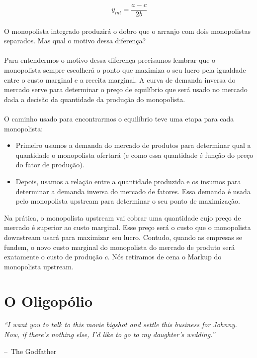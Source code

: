 \documentclass[a4paper,11pt,oneside]{book}
\makeatletter
\theoremstyle{definition}
\theoremstyle{break}
\newenvironment{chapquote}[2][2em]
  {\setlength{\@tempdima}{#1}%
   \def\chapquote@author{#2}%
   \parshape 1 \@tempdima \dimexpr\textwidth-2\@tempdima\relax%
   \itshape}
  {\par\normalfont\hfill--\ \chapquote@author\hspace*{\@tempdima}\par\bigskip}
\makeatother
\begin{document}
$$ y_{int} = \frac{a - c}{2b}$$
\\
O monopolista integrado produzirá o dobro que o arranjo com dois monopolistas separados. Mas qual o motivo dessa diferença?
\\
\\
Para entendermos o motivo dessa diferença precisamos lembrar que o monopolista sempre escolherá o ponto que maximiza o seu lucro pela igualdade entre o custo marginal e a receita marginal. A curva de demanda inversa do mercado serve para determinar o preço de equilíbrio que será usado no mercado dada a decisão da quantidade da produção do monopolista.
\\
\\
O caminho usado para encontrarmos o equilíbrio teve uma etapa para cada monopolista:
\begin{itemize}

\item Primeiro usamos a demanda do mercado de produtos para determinar qual a quantidade o monopolista ofertará (e como essa quantidade é função do preço do fator de produção).

\item Depois, usamos a relação entre a quantidade produzida e os insumos para determinar a demanda inversa do mercado de fatores. Essa demanda é usada pelo monopolista upstream para determinar o seu ponto de maximização.

\end{itemize}

Na prática, o monopolista upstream vai cobrar uma quantidade cujo preço de mercado é superior ao custo marginal. Esse preço será o custo que o monopolista downstream usará para maximizar seu lucro. Contudo, quando as empresas se fundem, o novo custo marginal do monopolista do mercado de produto será exatamente o custo de produção $c$. Nós retiramos de cena o Markup do monopolista upstream.

\chapter{O Oligopólio}

\begin{chapquote}{The Godfather}
	``I want you to talk to this movie bigshot and settle this business for Johnny. Now, if there's nothing else, I'd like to go to my daughter's wedding.''
\end{chapquote}
\end{document}
